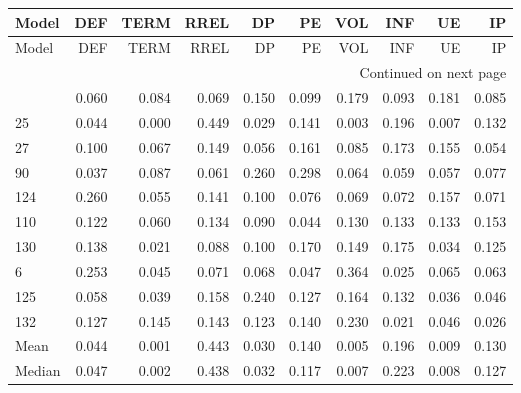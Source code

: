 \begin{longtable}{lrrrrrrrrr}
\label{tab:SSD_loss_standardised_10_retrained}\\
\toprule
 Model &   DEF &  TERM &  RREL &    DP &    PE &   VOL &   INF &    UE &    IP \\
\midrule
\endfirsthead

\toprule
 Model &   DEF &  TERM &  RREL &    DP &    PE &   VOL &   INF &    UE &    IP \\
\midrule
\endhead
\midrule
\multicolumn{10}{r}{{Continued on next page}} \\
\midrule
\endfoot

\bottomrule
\endlastfoot
    76 & 0.060 & 0.084 & 0.069 & 0.150 & 0.099 & 0.179 & 0.093 & 0.181 & 0.085 \\
    25 & 0.044 & 0.000 & 0.449 & 0.029 & 0.141 & 0.003 & 0.196 & 0.007 & 0.132 \\
    27 & 0.100 & 0.067 & 0.149 & 0.056 & 0.161 & 0.085 & 0.173 & 0.155 & 0.054 \\
    90 & 0.037 & 0.087 & 0.061 & 0.260 & 0.298 & 0.064 & 0.059 & 0.057 & 0.077 \\
   124 & 0.260 & 0.055 & 0.141 & 0.100 & 0.076 & 0.069 & 0.072 & 0.157 & 0.071 \\
   110 & 0.122 & 0.060 & 0.134 & 0.090 & 0.044 & 0.130 & 0.133 & 0.133 & 0.153 \\
   130 & 0.138 & 0.021 & 0.088 & 0.100 & 0.170 & 0.149 & 0.175 & 0.034 & 0.125 \\
     6 & 0.253 & 0.045 & 0.071 & 0.068 & 0.047 & 0.364 & 0.025 & 0.065 & 0.063 \\
   125 & 0.058 & 0.039 & 0.158 & 0.240 & 0.127 & 0.164 & 0.132 & 0.036 & 0.046 \\
   132 & 0.127 & 0.145 & 0.143 & 0.123 & 0.140 & 0.230 & 0.021 & 0.046 & 0.026 \\
  Mean & 0.044 & 0.001 & 0.443 & 0.030 & 0.140 & 0.005 & 0.196 & 0.009 & 0.130 \\
Median & 0.047 & 0.002 & 0.438 & 0.032 & 0.117 & 0.007 & 0.223 & 0.008 & 0.127 \\
\end{longtable}
